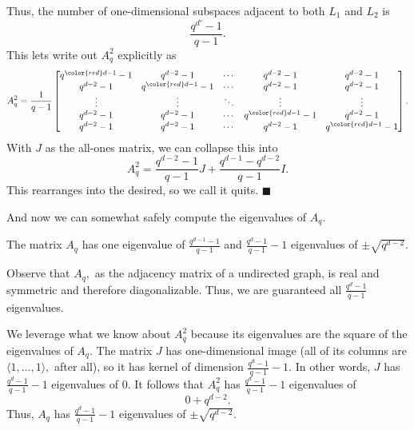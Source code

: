 Thus, the number of one-dimensional subspaces adjacent to both $L_1$ and $L_2$ is
\[\frac{q^{d'}-1}{q-1}.\]
This lets write out $A_q^2$ explicitly as
\[A_q^2=\frac1{q-1}\begin{bmatrix}
    q^{\color{red}d-1}-1 & q^{d-2}-1 & \cdots & q^{d-2} - 1 & q^{d-2}-1 \\
    q^{d-2}-1 & q^{\color{red}d-1}-1 & \cdots & q^{d-2} - 1 & q^{d-2}-1 \\
    \vdots & \vdots & \ddots & \vdots & \vdots \\
    q^{d-2}-1 & q^{d-2}-1 & \cdots & q^{\color{red}d-1} - 1 & q^{d-2}-1 \\
    q^{d-2}-1 & q^{d-2}-1 & \cdots & q^{d-2} - 1 & q^{\color{red}d-1}-1
\end{bmatrix}.\]
With $J$ as the all-ones matrix, we can collapse this into
\[A_q^2=\frac{q^{d-2}-1}{q-1}J+\frac{q^{d-1}-q^{d-2}}{q-1}I.\]
This rearranges into the desired, so we call it quits. $\blacksquare$

And now we can somewhat safely compute the eigenvalues of $A_q.$
\begin{lemma}
    The matrix $A_q$ has one eigenvalue of $\frac{q^{d-1}-1}{q-1}$ and $\frac{q^d-1}{q-1}-1$ eigenvalues of $\pm\sqrt{q^{d-2}}.$
\end{lemma}
Observe that $A_q,$ as the adjacency matrix of a undirected graph, is real and symmetric and therefore diagonalizable. Thus, we are guaranteed all $\frac{q^d-1}{q-1}$ eigenvalues.

We leverage what we know about $A_q^2$ because its eigenvalues are the square of the eigenvalues of $A_q.$ The matrix $J$ has one-dimensional image (all of its columns are $\langle1,\ldots,1\rangle,$ after all), so it has kernel of dimension $\frac{q^d-1}{q-1}-1.$ In other words, $J$ has $\frac{q^d-1}{q-1}-1$ eigenvalues of $0.$ It follows that $A_q^2$ has $\frac{q^d-1}{q-1}-1$ eigenvalues of
\[0+q^{d-2}.\]
Thus, $A_q$ has $\frac{q^d-1}{q-1}-1$ eigenvalues of $\pm\sqrt{q^{d-2}}.$

